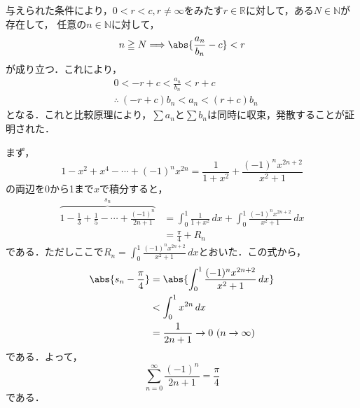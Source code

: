 

\begin{tproof}
    与えられた条件により，$0 <r <c , r \ne \infty $をみたす$r \in \mathbb{R}$に対して，ある$N \in \mathbb{N}$が存在して，
    任意の$n \in \mathbb{N}$に対して，
    \[
        n \ge N \Longrightarrow \abs{\frac{a_n}{b_n}-c}<r
    \]
    が成り立つ．これにより，
    \begin{align*}
         & 0<-r +c < \frac{a_n}{b_n} < r+c            \\
         & \therefore ~  (-r+c) b_n < a_n < (r+c) b_n
    \end{align*}
    となる．これと比較原理により，$\sum a_n$と$\sum b_n$は同時に収束，発散することが証明された．
\end{tproof}

\begin{tanswer}
    まず，
    \[
        1-x^2+x^4-\cdots+(-1)^n x^{2n} =\frac{1}{1+x^2} +\frac{(-1)^n x^{2n+2}}{x^2+1}
    \]
    の両辺を0から1まで$x$で積分すると，
    \begin{align*}
        \overbrace{1-\frac{1}{3}+\frac{1}{5}-\cdots+\frac{(-1)^n}{2n+1}}^{s_n} & =\int_{0}^{1} \frac{1}{1+x^2} \, dx +\int_{0}^{1}\frac{(-1)^n x^{2n+2}}{x^2+1}  \, dx \\
                                                                               & = \frac{\pi}{4} + R_n
    \end{align*}
    である．ただしここで$R_n =\int_{0}^{1}\frac{(-1)^n x^{2n+2}}{x^2+1} \, dx$とおいた．この式から，
    \begin{align*}
        \abs{s_n -\frac{\pi}{4}  } & = \abs{\int_{0}^{1}\frac{(-1)^n x^{2n+2}}{x^2+1} \, dx } \\
                                   & < \int_{0}^{1} x^{2n} \, dx                              \\
                                   & =\frac{1}{2n+1} \to 0 ~(n \to \infty)
    \end{align*}
    である．よって，
    \[
        \sum_{n=0}^{\infty} \frac{(-1)^n}{2n+1} =\frac{\pi}{4}
    \]
    である．
\end{tanswer}




